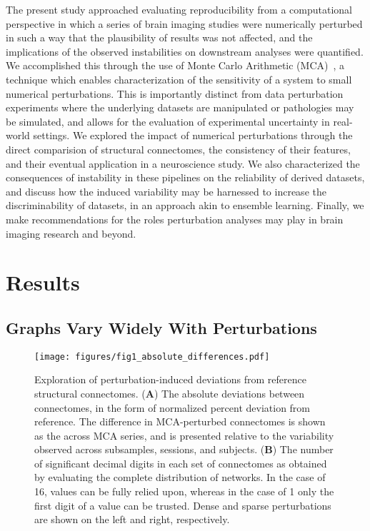 \documentclass[fleqn,10pt]{SelfArx} %
\newcommand{\new}[1]{{#1}}
\newcommand{\newtwo}[1]{{#1}}
\begin{document}
The present study approached evaluating reproducibility from a computational perspective in which a series of brain
imaging studies were numerically perturbed \new{in} such \new{a way} that the plausibility of results was not affected, and the
implications of the observed instabilities \new{on downstream analyses} were quantified. We accomplished this through the use of Monte Carlo
Arithmetic (MCA)~\cite{Parker1997-qq,Denis2016-wo}, a technique which enables characterization of the sensitivity of a system to
small \new{numerical} perturbations. \new{This is importantly distinct from data perturbation experiments where the underlying
datasets are manipulated or pathologies may be simulated, and allows for the evaluation of experimental uncertainty in real-world
settings.} We explored the impact of \new{numerical} perturbations through the direct comparision of structural connectomes,
the consistency of their features, and their eventual application in a neuroscience study. \new{We also characterized the}
consequences \new{of instability in these pipelines on the reliability of derived datasets,} and \new{discuss how the induced
variability may be harnessed to increase the discriminability of datasets, in an approach akin to ensemble learning}.
\new{Finally, we} make recommendations for the roles \new{perturbation} analyses may play in brain imaging research \new{and beyond}.

\section*{Results}
\subsection*{Graphs Vary Widely With Perturbations}
\begin{figure*}[hbt]\centering
\texttt{[image: figures/fig1\_absolute\_differences.pdf]}
\caption{Exploration of perturbation-induced deviations from reference \newtwo{structural} connectomes.
(\textbf{A}) The absolute deviations \new{between connectomes}, in the form of normalized percent deviation from
reference. \new{The difference in MCA-perturbed connectomes is} shown as the across MCA series, \new{and is presented}
relative to \new{the variability observed} across subsamples, sessions, and subjects.
(\textbf{B}) The number of significant decimal digits in each set of connectomes as obtained \new{by} evaluating the
\new{complete distribution of networks}. In the case of 16, values can be fully relied upon, whereas in the case of 1 only the first
digit of a value can be trusted. \new{Dense} and \new{sparse} perturbations are shown on the left and right, respectively.}
\label{fig:absolute}
\end{figure*}
\end{document}
